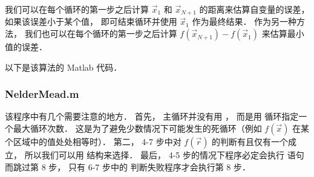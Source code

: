 我们可以在每个循环的第一步之后计算 $\vec x_1$ 和 $\vec x_{N+1}$ 的距离来估算自变量的误差， 如果该误差小于某个值， 即可结束循环并使用 $\vec x_1$ 作为最终结果． 作为另一种方法， 我们也可以在每个循环的第一步之后计算 $f(\vec x_{N+1}) - f(\vec x_1)$ 来估算最小值的误差．

以下是该算法的 Matlab 代码．

\subsubsection{NelderMead.m}


该程序中有几个需要注意的地方． 首先， 主循环并没有用 ， 而是用  循环指定一个最大循环次数． 这是为了避免少数情况下可能发生的死循环（例如 $f(\vec x)$ 在某个区域中的值处处相等时）． 第二， 4-7 步中对 $f(\vec r)$ 的判断有且仅有一个成立， 所以我们可以用  结构来选择． 最后， 4-5 步的情况下程序必定会执行  语句而跳过第 8 步， 只有 6-7 步中的  判断失败程序才会执行第 8 步．



